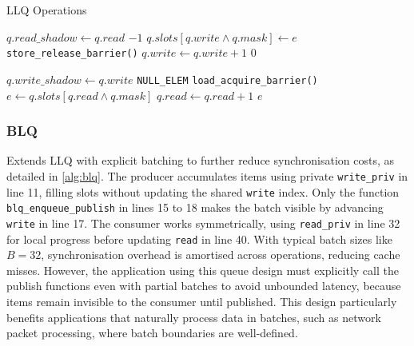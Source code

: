 \begin{algorithm}[!ht]
    \centering
    \captionsetup{justification=centering}
    \caption{\ac{LLQ} Operations \cite{MaffioneCacheAware}}
    \label{alg:llq}
    \scriptsize
    \begin{algorithmic}[1]
             
                \State $q.read\_shadow \gets q.read$ 
                    \State \Return $-1$ 
                \EndIf
            \EndIf
            \State $q.slots[q.write \land q.mask] \gets e$
            \State \texttt{store\_release\_barrier()}
            \State $q.write \gets q.write + 1$
            \State \Return $0$
        \EndFunction
        
        \State
        
             
                \State $q.write\_shadow \gets q.write$ 
                    \State \Return \texttt{NULL\_ELEM}
                \EndIf
            \EndIf
            \State \texttt{load\_acquire\_barrier()}
            \State $e \gets q.slots[q.read \land q.mask]$
            \State $q.read \gets q.read + 1$
            \State \Return $e$
        \EndFunction
    \end{algorithmic}
\end{algorithm}

\subsubsection{\acf{BLQ}}
Extends \ac{LLQ} with explicit batching to further reduce synchronisation costs, as detailed in \cref{alg:blq}. The producer accumulates items using private \texttt{write\_priv} in line 11, filling slots without updating the shared \texttt{write} index. Only the function \texttt{blq\_enqueue\_publish} in lines 15 to 18 makes the batch visible by advancing \texttt{write} in line 17. The consumer works symmetrically, using \texttt{read\_priv} in line 32 for local progress before updating \texttt{read} in line 40. With typical batch sizes like $B = 32$, synchronisation overhead is amortised across operations, reducing cache misses. However, the application using this queue design must explicitly call the publish functions even with partial batches to avoid unbounded latency, because items remain invisible to the consumer until published. This design particularly benefits applications that naturally process data in batches, such as network packet processing, where batch boundaries are well-defined. \cite{MaffioneCacheAware}

